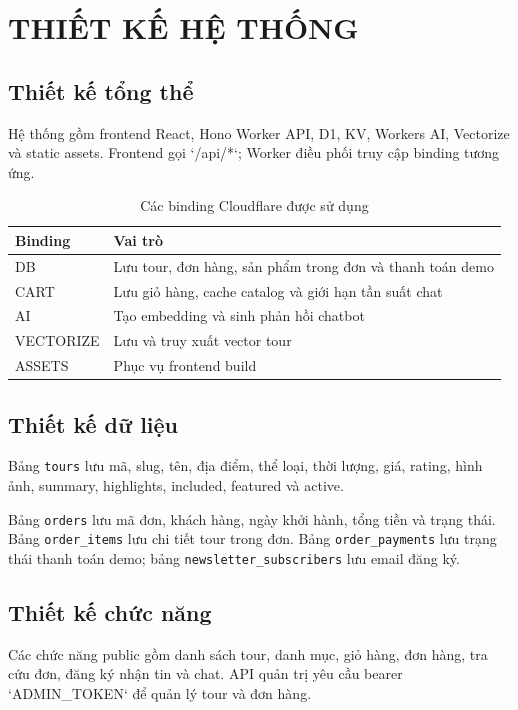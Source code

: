 \setcounter{chapter}{2}
\setcounter{chapter}{2}
\setcounter{table}{0}
\setcounter{figure}{0}
\chapter{THIẾT KẾ HỆ THỐNG}

\section{Thiết kế tổng thể}
Hệ thống gồm frontend React, Hono Worker API, D1, KV, Workers AI, Vectorize và static assets. Frontend gọi `/api/*`; Worker điều phối truy cập binding tương ứng.

\begin{table}[H]
\centering
\caption{Các binding Cloudflare được sử dụng}
\label{tab:bindings}
\begin{tabular}{|l|p{9cm}|}
\hline
\textbf{Binding} & \textbf{Vai trò} \\
\hline
DB & Lưu tour, đơn hàng, sản phẩm trong đơn và thanh toán demo \\
CART & Lưu giỏ hàng, cache catalog và giới hạn tần suất chat \\
AI & Tạo embedding và sinh phản hồi chatbot \\
VECTORIZE & Lưu và truy xuất vector tour \\
ASSETS & Phục vụ frontend build \\
\hline
\end{tabular}
\end{table}

\section{Thiết kế dữ liệu}
Bảng \texttt{tours} lưu mã, slug, tên, địa điểm, thể loại, thời lượng, giá, rating, hình ảnh, summary, highlights, included, featured và active.

Bảng \texttt{orders} lưu mã đơn, khách hàng, ngày khởi hành, tổng tiền và trạng thái. Bảng \texttt{order\_items} lưu chi tiết tour trong đơn. Bảng \texttt{order\_payments} lưu trạng thái thanh toán demo; bảng \texttt{newsletter\_subscribers} lưu email đăng ký.

\section{Thiết kế chức năng}
Các chức năng public gồm danh sách tour, danh mục, giỏ hàng, đơn hàng, tra cứu đơn, đăng ký nhận tin và chat. API quản trị yêu cầu bearer `ADMIN_TOKEN` để quản lý tour và đơn hàng.

